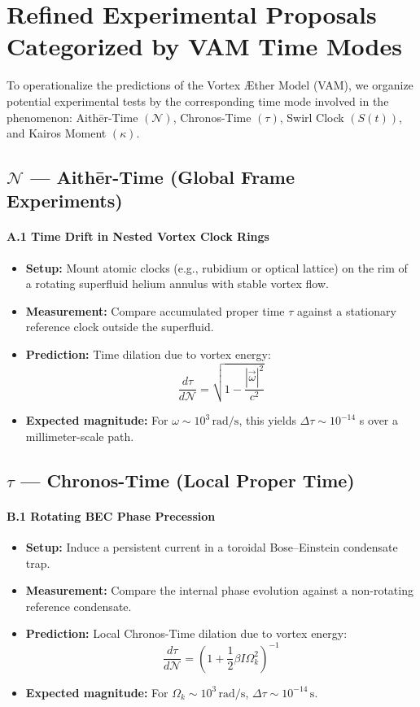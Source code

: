 \section{Refined Experimental Proposals Categorized by VAM Time Modes}

To operationalize the predictions of the Vortex \AE ther Model (VAM), we organize potential experimental tests by the corresponding time mode involved in the phenomenon: Aith\=er-Time \((\mathcal{N})\), Chronos-Time \((\tau)\), Swirl Clock \((S(t))\), and Kairos Moment \((\kappa)\).

\subsection*{\(\mathcal{N}\) --- Aith\=er-Time (Global Frame Experiments)}

\paragraph{A.1 Time Drift in Nested Vortex Clock Rings}
\begin{itemize}
    \item \textbf{Setup:} Mount atomic clocks (e.g., rubidium or optical lattice) on the rim of a rotating superfluid helium annulus with stable vortex flow.
    \item \textbf{Measurement:} Compare accumulated proper time \(\tau\) against a stationary reference clock outside the superfluid.
    \item \textbf{Prediction:} Time dilation due to vortex energy:
    \[
        \frac{d\tau}{d\mathcal{N}} = \sqrt{1 - \frac{|\vec{\omega}|^2}{c^2}}
    \]
    \item \textbf{Expected magnitude:} For \(\omega \sim 10^3 \, \mathrm{rad/s}\), this yields \(\Delta \tau \sim 10^{-14}\) s over a millimeter-scale path.
\end{itemize}

\subsection*{\(\tau\) --- Chronos-Time (Local Proper Time)}

\paragraph{B.1 Rotating BEC Phase Precession}
\begin{itemize}
    \item \textbf{Setup:} Induce a persistent current in a toroidal Bose--Einstein condensate trap.
    \item \textbf{Measurement:} Compare the internal phase evolution against a non-rotating reference condensate.
    \item \textbf{Prediction:} Local Chronos-Time dilation due to vortex energy:
    \[
        \frac{d\tau}{d\mathcal{N}} = \left(1 + \frac{1}{2} \beta I \Omega_k^2 \right)^{-1}
    \]
    \item \textbf{Expected magnitude:} For \( \Omega_k \sim 10^3 \, \mathrm{rad/s} \), \( \Delta \tau \sim 10^{-14} \, \mathrm{s} \).
\end{itemize}

